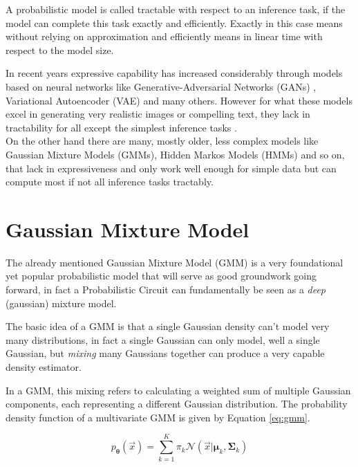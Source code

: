 \begin{definition}[Tractability]
    A probabilistic model is called tractable with respect to an inference task, if the model can complete this 
    task exactly and efficiently. Exactly in this case means without relying on approximation and efficiently 
    means in linear time with respect to the model size. \cite{pc_intro}
\end{definition}

In recent years expressive capability has increased considerably through models based on neural networks like Generative-Adversarial
Networks (GANs) \cite{gan}, Variational Autoencoder (VAE) \cite{vae} and many others. However for what these models excel in generating 
very realistic images or compelling text, they lack in tractability for all except the simplest inference tasks
\cite{pc_intro}. \\

On the other hand there are many, mostly older, less complex models like Gaussian Mixture Models (GMMs), Hidden Markos Models (HMMs) and so on, 
that lack in expressiveness and only work well enough for simple data but can compute most if not all inference tasks tractably.

\section{Gaussian Mixture Model}
\label{sec:gmm}

The already mentioned Gaussian Mixture Model (GMM) \cite{ml_book} is a very foundational yet popular probabilistic model that will serve as good groundwork 
going forward, in fact a Probabilistic Circuit can fundamentally be seen as a \emph{deep} (gaussian) mixture model. 

The basic idea of a GMM is that a single Gaussian density can't model very many distributions, in fact a single Gaussian 
can only model, well a single Gaussian, but \emph{mixing} many Gaussians together can produce a very capable density estimator. 

In a GMM, this mixing refers to calculating a weighted sum of multiple Gaussian components, each representing a different Gaussian distribution. 
The probability density function of a multivariate GMM is given by Equation \ref{eq:gmm}.

\begin{equation}
    p_{\boldsymbol{\theta}}(\vec x) =  \sum_{k=1}^K \pi_k \mathcal{N}(\vec x|\boldsymbol{\mu}_k, \boldsymbol{\Sigma}_k) 
    \label{eq:gmm}
\end{equation}

